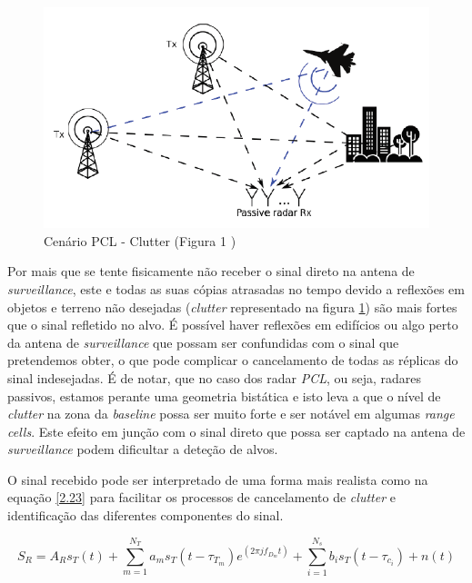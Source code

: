 \begin{figure}[h]
\centering
\includegraphics[scale=0.6]{chapters/ch4/assets/clutter}
\caption[Cenário PCL - Clutter]{Cenário PCL - Clutter (Figura 1 \cite{Peto2018})}
\label{fig:clutter}
\end{figure}


Por mais que se tente fisicamente não receber o sinal direto na antena de \textit{surveillance}, este e todas as suas cópias atrasadas no tempo devido a reflexões em objetos e terreno não desejadas (\textit{clutter} representado na figura \ref{fig:clutter}) são mais fortes que o sinal refletido no alvo. É possível haver reflexões em edifícios ou algo perto da antena de \textit{surveillance} que possam ser confundidas com o sinal que pretendemos obter, o que pode complicar o cancelamento de todas as réplicas do sinal indesejadas. É de notar, que no caso dos radar \textit{\gls{PCL}}, ou seja, radares passivos, estamos perante uma geometria bistática e isto leva a que o nível de \textit{clutter} na zona da \textit{baseline} possa ser muito forte e ser notável em algumas \textit{range cells}. Este efeito em junção com o sinal direto que possa ser captado na antena de \textit{surveillance} podem dificultar a deteção de alvos.\par 
O sinal recebido pode ser interpretado de uma forma mais realista como na equação \ref{2.23} para facilitar os processos de cancelamento de \textit{clutter} e identificação das diferentes componentes do sinal.


\begin{equation} \label{2.23}
S_{R}=A_{R}s_{T}\left( t\right)+\sum_{m=1}^{N_{T}}a_{m}s_{T}\left( t-\tau_{T_{m}}\right)e^{\left( 2\pi j f_{D_{m}}t\right)}+\sum_{i=1}^{N_{s}}b_{i}s_{T}\left( t-\tau_{c_{i}}\right)+n\left( t\right)    
\end{equation}

